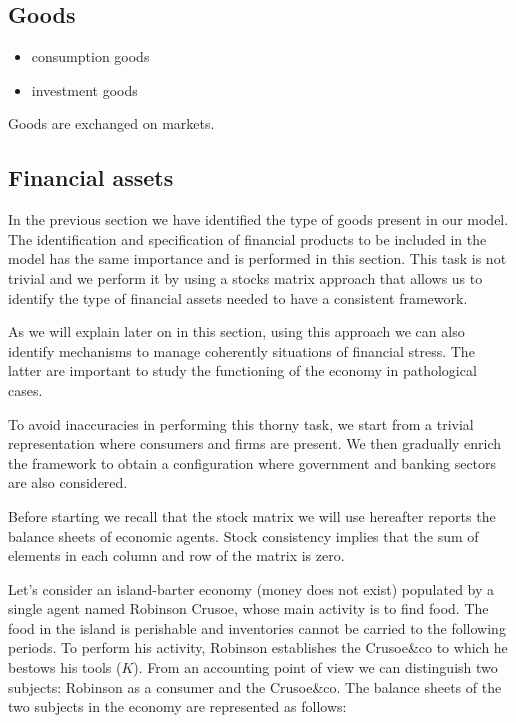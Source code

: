 \documentclass{article}
\begin{document}
\subsection{Goods}
\begin{itemize}
	\item consumption goods
	\item investment goods
\end{itemize}

Goods are exchanged on markets.

\subsection{Financial assets}

In the previous section we have identified the type of goods present in our model. The identification and specification of financial products to be included in the model has the same importance and is performed in this section. This task is not trivial and we perform it by using  
a stocks matrix approach that allows us to identify the type of financial assets needed to have a consistent framework. 

As we will explain later on in this section, using this approach we can also identify mechanisms to manage coherently situations of financial stress. The latter are important to study the functioning of the economy in pathological cases.  

To avoid inaccuracies in performing this thorny task, we start from a trivial representation where consumers and firms are present. We then gradually enrich the framework to obtain a configuration where government and banking sectors are also considered.

Before starting we recall that the stock matrix we will use hereafter reports the balance sheets of economic agents. 
Stock consistency implies that the sum of elements in each column and row of the matrix is zero.  


Let's consider an island-barter economy (money does not exist) populated by a single agent named Robinson Crusoe, whose main activity is to find food. 
The food in the island is perishable and inventories cannot be carried to the following periods. To perform his activity, Robinson establishes the Crusoe\&co to which he bestows his tools ($K$). From an accounting point of view we can distinguish two subjects: Robinson as a consumer and the Crusoe\&co. The balance sheets of the two subjects in the economy are represented as follows:
\end{document}
